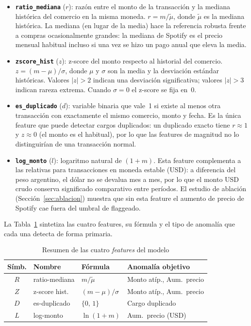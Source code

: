 \documentclass[conference]{IEEEtran}
\begin{document}
\begin{itemize}
  \item \textbf{\texttt{ratio\_mediana}} ($r$): raz\'on entre el monto de la
  transacci\'on y la mediana hist\'orica del comercio en la misma moneda.
  $r = m / \tilde{\mu}$, donde $\tilde{\mu}$ es la mediana hist\'orica.
  La mediana (en lugar de la media) hace la referencia robusta frente a compras
  ocasionalmente grandes: la mediana de Spotify es el precio mensual habitual
  incluso si una vez se hizo un pago anual que eleva la media.

  \item \textbf{\texttt{zscore\_hist}} ($z$): z-score del monto respecto al
  historial del comercio. $z = (m - \mu) / \sigma$, donde $\mu$ y $\sigma$ son
  la media y la desviaci\'on est\'andar hist\'oricas. Valores $|z| > 2$ indican
  una desviaci\'on significativa; valores $|z| > 3$ indican rareza extrema.
  Cuando $\sigma = 0$ el z-score se fija en~0.

  \item \textbf{\texttt{es\_duplicado}} ($d$): variable binaria que vale~1 si existe
  al menos otra transacci\'on con exactamente el mismo comercio, monto y fecha.
  Es la \'unica feature que puede detectar cargos duplicados: un duplicado exacto
  tiene $r \approx 1$ y $z \approx 0$ (el monto es el habitual), por lo que las
  features de magnitud no lo distinguir\'ian de una transacci\'on normal.

  \item \textbf{\texttt{log\_monto}} ($l$): logaritmo natural de $(1 + m)$.
  Esta feature complementa a las relativas para transacciones en moneda estable
  (USD): a diferencia del peso argentino, el d\'olar no se devalua mes a mes, por
  lo que el monto USD crudo conserva significado comparativo entre per\'iodos.
  El estudio de ablaci\'on (Secci\'on~\ref{sec:ablacion}) muestra que sin esta
  feature el aumento de precio de Spotify cae fuera del umbral de flaggeado.
\end{itemize}

La Tabla~\ref{tab:features} sintetiza las cuatro features, su f\'ormula y el tipo
de anomal\'ia que cada una detecta de forma primaria.

\begin{table}[h]
\caption{Resumen de las cuatro \emph{features} del modelo}
\label{tab:features}
\centering
\begin{tabular}{clp{1.6cm}p{2.0cm}}
\toprule
\textbf{S\'imb.} & \textbf{Nombre} & \textbf{F\'ormula} & \textbf{Anomal\'ia objetivo} \\
\midrule
$R$ & ratio-mediana & $m/\tilde{\mu}$  & Monto at\'ip., Aum.\ precio \\
$Z$ & z-score hist. & $(m-\mu)/\sigma$ & Monto at\'ip., Aum.\ precio \\
$D$ & es-duplicado  & $\{0,\,1\}$      & Cargo duplicado \\
$L$ & log-monto     & $\ln(1+m)$       & Aum.\ precio (USD) \\
\bottomrule
\end{tabular}
\end{table}
\end{document}
